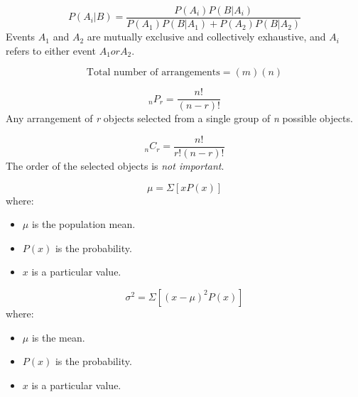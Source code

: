 \begin{equation}
\label{bayes' theorem}
P(A_{i}\vert B) = \frac{P(A_{i})P(B \vert A_{i})}{P(A_{1})P(B \vert A_{1}) + P(A_{2})P(B \vert A_{2})}
\end{equation}
Events $A_{1}$ and $A_{2}$ are mutually exclusive and collectively exhaustive, and $A_{i}$ refers to either event $A_{1} or A_{2}$.
\hformbar


\begin{equation}
\label{multiplication formula}
\text{Total number of arrangements} = (m)(n)
\end{equation}
\hformbar


\begin{equation}
\label{permutation}
{}_nP_{r} = \frac{n!}{(n - r)!}
\end{equation}
Any arrangement of \emph{r} objects selected from a single group of \emph{n} possible objects.
\hformbar


\begin{equation}
\label{combination formula}
{}_nC_{r} = \frac{n!}{r!(n - r)!}
\end{equation}
The order of the selected objects is \emph{not important}.
\hformbar


\begin{equation}
\label{mean of probability distribution}
\mu = \Sigma \left[ xP(x) \right]
\end{equation}
where: 
\begin{itemize}
 \item $\mu$ is the population mean. 
 \item $P(x)$ is the probability.
 \item $x$ is a particular value.
\end{itemize}
\hformbar


\begin{equation}
\label{variance of a probability distribution}
\sigma^{2} = \Sigma\left[ (x - \mu)^{2}P(x) \right]
\end{equation}
where: 
\begin{itemize}
 \item $\mu$ is the mean.
 \item $P(x)$ is the probability.
 \item $x$ is a particular value.
\end{itemize}
\hformbar


